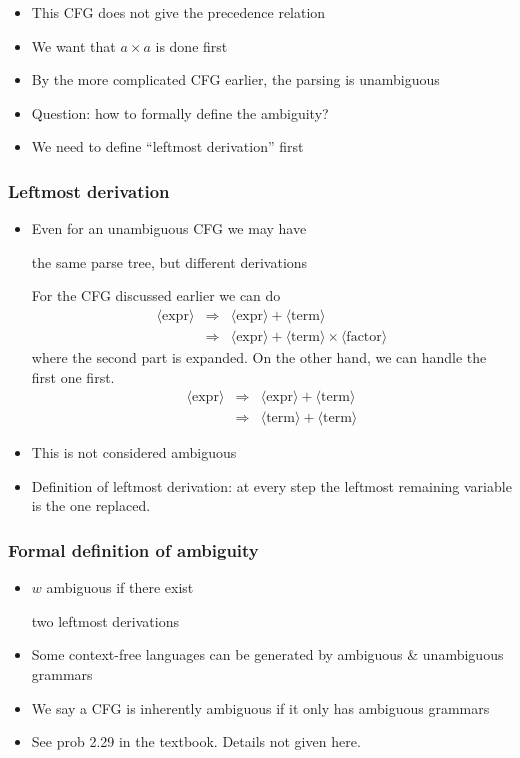\begin{frame}[allowframebreaks]
\begin{itemize}
\item This CFG does not give the precedence relation
\item We want that $a \times a$ is done first
\item By the more complicated CFG earlier,
  the parsing is unambiguous
\item Question: how to formally define the ambiguity?
\item We need to define ``leftmost derivation'' first
\end{itemize}\end{frame} \begin{frame}[allowframebreaks] \frametitle{Leftmost derivation}
  \begin{itemize}
  \item Even for an unambiguous CFG we may
    have
    \begin{center}
the same parse tree, but different derivations
\end{center}
For the CFG discussed earlier we can do
\begin{eqnarray*}
  \langle \text{expr}\rangle& \Rightarrow& \langle \text{expr}\rangle+\langle \text{term}\rangle\\
& \Rightarrow & \langle \text{expr}\rangle+\langle \text{term}\rangle\times\langle \text{factor}\rangle
\end{eqnarray*}
where the second part is expanded. On the other hand, we
can handle the first one first.
\begin{eqnarray*}
\langle \text{expr}\rangle & \Rightarrow & \langle \text{expr}\rangle + \langle \text{term}\rangle\\
& \Rightarrow & \langle \text{term}\rangle + \langle \text{term}\rangle
\end{eqnarray*}
\item This is not considered ambiguous
\item Definition of leftmost derivation:
  at every step the leftmost remaining variable is the one replaced.
\end{itemize}\end{frame} \begin{frame}[allowframebreaks] \frametitle{Formal definition of ambiguity}
  \begin{itemize}
\item $w$ ambiguous if there exist
  \begin{center}
two  leftmost derivations
\end{center}
\item Some context-free languages
can be generated by ambiguous \& unambiguous 
grammars
\item We say a CFG is inherently ambiguous
if it only has ambiguous grammars

\item [] See prob 2.29 in the textbook. Details not given here.

\end{itemize}\end{frame}



